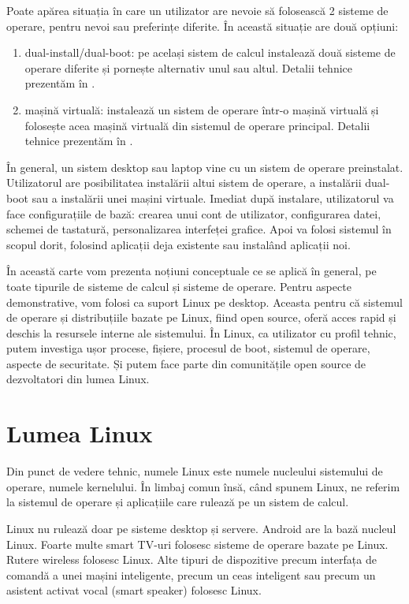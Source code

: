 Poate apărea situația în care un utilizator are nevoie să folosească 2 sisteme de operare, pentru nevoi sau preferințe diferite.
În această situație are două opțiuni:

\begin{enumerate}
  \item dual-install/dual-boot: pe același sistem de calcul instalează două sisteme de operare diferite și pornește alternativ unul sau altul.
    Detalii tehnice prezentăm în .
  \item mașină virtuală: instalează un sistem de operare într-o mașină virtuală și folosește acea mașină virtuală din sistemul de operare principal.
    Detalii tehnice prezentăm în .
\end{enumerate}

În general, un sistem desktop sau laptop vine cu un sistem de operare preinstalat.
Utilizatorul are posibilitatea instalării altui sistem de operare, a instalării dual-boot sau a instalării unei mașini virtuale.
Imediat după instalare, utilizatorul va face configurațiile de bază: crearea unui cont de utilizator, configurarea datei, schemei de tastatură, personalizarea interfeței grafice.
Apoi va folosi sistemul în scopul dorit, folosind aplicații deja existente sau instalând aplicații noi.

În această carte vom prezenta noțiuni conceptuale ce se aplică în general, pe toate tipurile de sisteme de calcul și sisteme de operare.
Pentru aspecte demonstrative, vom folosi ca suport Linux pe desktop.
Aceasta pentru că sistemul de operare și distribuțiile bazate pe Linux, fiind open source, oferă acces rapid și deschis la resursele interne ale sistemului.
În Linux, ca utilizator cu profil tehnic, putem investiga ușor procese, fișiere, procesul de boot, sistemul de operare, aspecte de securitate.
Și putem face parte din comunitățile open source de dezvoltatori din lumea Linux.

\section{Lumea Linux}
\label{sec:intro:linux}

Din punct de vedere tehnic, numele Linux este numele nucleului sistemului de operare, numele kernelului.
În limbaj comun însă, când spunem Linux, ne referim la sistemul de operare și aplicațiile care rulează pe un sistem de calcul.

Linux nu rulează doar pe sisteme desktop și servere.
Android are la bază nucleul Linux.
Foarte multe smart TV-uri folosesc sisteme de operare bazate pe Linux.
Rutere wireless folosesc Linux.
Alte tipuri de dispozitive precum interfața de comandă a unei mașini inteligente, precum un ceas inteligent sau precum un asistent activat vocal (smart speaker) folosesc Linux.


